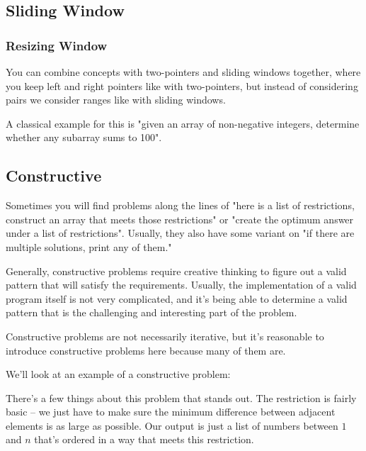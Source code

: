 \subsection{Sliding Window}



\subsubsection{Resizing Window}

You can combine concepts with two-pointers and sliding windows together, where you keep left and right pointers like with two-pointers, but instead of considering pairs we consider ranges like with sliding windows.

A classical example for this is "given an array of non-negative integers, determine whether any subarray sums to 100".


\subsection{Constructive}

Sometimes you will find problems along the lines of "here is a list of restrictions, construct an array that meets those restrictions" or "create the optimum answer under a list of restrictions". Usually, they also have some variant on "if there are multiple solutions, print any of them."

Generally, constructive problems require creative thinking to figure out a valid pattern that will satisfy the requirements. Usually, the implementation of a valid program itself is not very complicated, and it's being able to determine a valid pattern that is the challenging and interesting part of the problem.

Constructive problems are not necessarily iterative, but it's reasonable to introduce constructive problems here because many of them are.

We'll look at an example of a constructive problem:

\hrulefill



\hrulefill

There's a few things about this problem that stands out. The restriction is fairly basic -- we just have to make sure the minimum difference between adjacent elements is as large as possible. Our output is just a list of numbers between $1$ and $n$ that's ordered in a way that meets this restriction.

